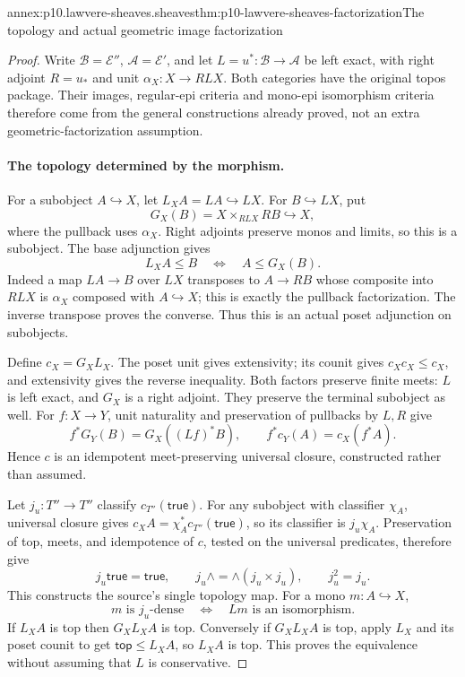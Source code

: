 \begin{annexitem}{annex:p10.lawvere-sheaves.sheaves}{thm:p10-lawvere-sheaves-factorization}{The topology and actual geometric image factorization}
\begin{proof}
Write \(\mathcal B=\mathcal E''\),
\(\mathcal A=\mathcal E'\), and let
\(L=u^*:\mathcal B\to\mathcal A\) be left exact,
with right adjoint \(R=u_*\) and unit
\(\alpha_X:X\to RLX\).  Both categories have the
original topos package.  Their images, regular-epi
criteria and mono-epi isomorphism criteria therefore
come from the general constructions already proved,
not an extra geometric-factorization assumption.

\paragraph{The topology determined by the morphism.}
For a subobject \(A\hookrightarrow X\), let
\(L_XA=LA\hookrightarrow LX\).  For
\(B\hookrightarrow LX\), put
\[
               G_X(B)=X\times_{RLX}RB\hookrightarrow X,
\]
where the pullback uses \(\alpha_X\).  Right adjoints
preserve monos and limits, so this is a subobject.
The base adjunction gives
\[
                    L_XA\leq B\quad\Longleftrightarrow\quad
                                      A\leq G_X(B).
\]
Indeed a map \(LA\to B\) over \(LX\) transposes
to \(A\to RB\) whose composite into \(RLX\)
is \(\alpha_X\) composed with \(A\hookrightarrow X\);
this is exactly the pullback factorization.  The
inverse transpose proves the converse.  Thus this
is an actual poset adjunction on subobjects.

Define \(c_X=G_XL_X\).  The poset unit gives
extensivity; its counit gives
\(c_Xc_X\leq c_X\), and extensivity gives the
reverse inequality.  Both factors preserve finite
meets: \(L\) is left exact, and \(G_X\) is a
right adjoint.  They preserve the terminal
subobject as well.  For \(f:X\to Y\), unit
naturality and preservation of pullbacks by
\(L,R\) give
\[
          f^*G_Y(B)=G_X((Lf)^*B),
          \qquad f^*c_Y(A)=c_X(f^*A).
\]
Hence \(c\) is an idempotent meet-preserving
universal closure, constructed rather than assumed.

Let \(j_u:T''\to T''\) classify
\(c_{T''}(\mathsf{true})\).  For any subobject
with classifier \(\chi_A\), universal closure
gives \(c_XA=\chi_A^*c_{T''}(\mathsf{true})\),
so its classifier is \(j_u\chi_A\).
Preservation of top, meets, and idempotence of
\(c\), tested on the universal predicates,
therefore give
\[
       j_u\mathsf{true}=\mathsf{true},\qquad
       j_u\land=\land(j_u\times j_u),\qquad j_u^2=j_u.
\]
This constructs the source's single topology map.
For a mono \(m:A\hookrightarrow X\),
\[
             m\text{ is }j_u\text{-dense}
                 \quad\Longleftrightarrow\quad Lm\text{ is an isomorphism}.
\]
If \(L_XA\) is top then \(G_XL_XA\) is top.
Conversely if \(G_XL_XA\) is top, apply \(L_X\)
and its poset counit to get
\(\mathsf{top}\leq L_XA\), so \(L_XA\) is top.
This proves the equivalence without assuming that
\(L\) is conservative.


\end{proof}
\end{annexitem}
